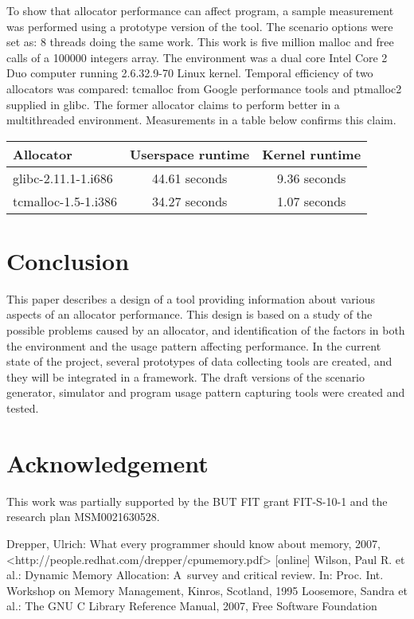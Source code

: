 \documentclass{eeict}
\begin{document}
To show that allocator performance can affect program, a sample measurement was performed using a prototype version of the tool. The scenario options were set as: 8 threads doing the same work. This work is five million malloc and free calls of a 100000 integers array. The environment was a dual core Intel Core 2 Duo computer running 2.6.32.9-70 Linux kernel. Temporal efficiency of two allocators was compared: tcmalloc from Google performance tools and ptmalloc2 supplied in glibc. The former allocator claims to perform better in a multithreaded environment. Measurements in a table below confirms this claim.
\begin{table}[h]
\begin{center}
\begin{tabular}{|l|c|c|}
\hline Allocator & Userspace runtime & Kernel runtime \\
\hline glibc-2.11.1-1.i686 & 44.61 seconds & 9.36 seconds \\
\hline tcmalloc-1.5-1.i386 & 34.27 seconds & 1.07 seconds \\
\hline
\end{tabular}
\end{center}
\label{table1}
\end{table}
\section{Conclusion}
This paper describes a design of a tool providing information about various aspects of an allocator performance. This design is based on a study of the possible problems caused by an allocator, and identification of the factors in both the environment and the usage pattern affecting performance. In the current state of the project, several prototypes of data collecting tools are created, and they will be integrated in a framework. The draft versions of the scenario generator, simulator and program usage pattern capturing tools were created and tested.

\section*{Acknowledgement}
This work was partially supported by the BUT FIT grant FIT-S-10-1 and the research plan MSM0021630528.
\begin{thebibliography}{9}
    Drepper, Ulrich: What every programmer should know about memory, 2007,
                     <http://people.redhat.com/drepper/cpumemory.pdf> [online]
    Wilson, Paul R. et al.: Dynamic Memory Allocation: A~survey and critical review. In: Proc. Int. Workshop on Memory Management, Kinros, Scotland, 1995
    Loosemore, Sandra et al.: The GNU C Library Reference Manual, 2007, Free Software Foundation

\end{thebibliography}
\end{document}
